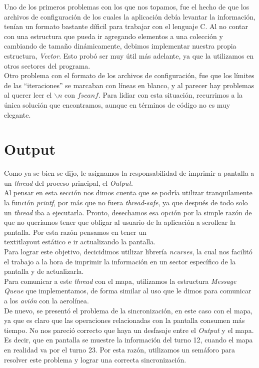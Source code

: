 \documentclass[a4paper,10pt]{article}
\begin{document}
Uno de los primeros problemas con los que nos topamos, fue el hecho de que los archivos de configuración de los cuales la aplicación debía levantar la información,
 tenían un formato bastante díficil para trabajar con el lenguaje C. Al no contar con una estructura que pueda ir agregando elementos a una colección y cambiando 
de tamaño dinámicamente, debimos implementar nuestra propia estructura, \textit{Vector}. Esto probó ser muy útil más adelante, ya que la utilizamos en otros sectores 
del programa.\\

Otro problema con el formato de los archivos de configuración, fue que los límites de las ``iteraciones'' se marcaban con líneas en blanco, y al parecer hay 
problemas al querer leer el $\backslash n$ con $fscanf$. Para lidiar con esta situación, recurrimos a la única solución que encontramos, aunque en términos de 
código no es muy elegante.\\

\newpage
\section{Output}

Como ya se bien se dijo, le asignamos la responsabilidad de imprimir a pantalla a un \textit{thread} del proceso principal, el \textit{Output}. \\

Al pensar en esta sección nos dimos cuenta que se podría utilizar tranquilamente la función \textit{printf}, por más que no fuera \textit{thread-safe},
 ya que después de todo solo un \textit{thread} iba a ejecutarla. Pronto, desechamos esa opción por la simple razón de que no queríamos tener que obligar al usuario 
de la aplicación a scrollear la pantalla. Por esta razón pensamos en tener un \\textit{layout} estático e ir actualizando la pantalla.\\
Para lograr este objetivo, decicidimos utilizar librería \textit{ncurses}, la cual nos facilitó el trabajo a la hora de imprimir la información en un sector específico
de la pantalla y de actualizarla.\\

Para comunicar a este \textit{thread} con el mapa, utilizamos la estructura \textit{Message Queue} que implementamos, de forma similar al uso que le dimos 
para comunicar a los \textit{avión} con la aerolínea.\\

De nuevo, se presentó el problema de la sincronización, en este caso con el mapa, ya que es claro que las operaciones relacionadas con la pantalla consumen más 
tiempo. No nos pareció correcto que haya un desfasaje entre el \textit{Output} y el mapa. Es decir, que en pantalla se muestre la información del turno 12, 
cuando el mapa en realidad va por el turno 23. Por esta razón, utilizamos un semáforo para resolver este problema y lograr una correcta sincronización.
\end{document}
